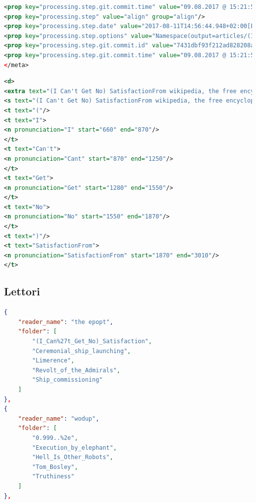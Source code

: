 \documentclass[12pt,a4paper,titlepage]{article}
\begin{document}
\begin{lstlisting}[language=xml,firstnumber=1, caption=Metadati delle annotazioni delle parole in un audio, label=metadati_annotazioni,captionpos=b, basicstyle=\tiny]
<prop key="processing.step.git.commit.time" value="09.08.2017 @ 15:21:55 CEST" group="tokenize"/>
<prop key="processing.step" value="align" group="align"/>
<prop key="processing.step.date" value="2017-08-11T14:56:44.948+02:00[Europe/Berlin]" group="align"/>
<prop key="processing.step.options" value="Namespace(output=articles/(I_Can%27t_Get_No)_Satisfaction/aligned.swc, transcript=articles/(I_Can%27t_Get_No)_Satisfaction/tokenized.swc, g2p=../model_en/model.fst.ser, phone=false, subparser_name=align, dict=../model_en/empty.dic, acoustic_model=../model_en/, audio=articles/(I_Can%27t_Get_No)_Satisfaction/audio.wav)" group="align"/>
<prop key="processing.step.git.commit.id" value="7431dbf93f212ad828208abaf8f518fb8de11ff3" group="align"/>
<prop key="processing.step.git.commit.time" value="09.08.2017 @ 15:21:55 CEST" group="align"/>
</meta>
\end{lstlisting}

\begin{lstlisting}[language=xml,firstnumber=1, caption=Annotazioni delle parole in un audio, label=annotazioni,captionpos=b, basicstyle=\tiny]
<d>
<extra text="(I Can't Get No) SatisfactionFrom wikipedia, the free encyclopedia at e n dot wikipedia dot org.">
<s text="(I Can't Get No) SatisfactionFrom wikipedia, the free encyclopedia at e n dot wikipedia dot org.">
<t text="("/>
<t text="I">
<n pronunciation="I" start="660" end="870"/>
</t>
<t text="Can't">
<n pronunciation="Cant" start="870" end="1250"/>
</t>
<t text="Get">
<n pronunciation="Get" start="1280" end="1550"/>
</t>
<t text="No">
<n pronunciation="No" start="1550" end="1870"/>
</t>
<t text=")"/>
<t text="SatisfactionFrom">
<n pronunciation="SatisfactionFrom" start="1870" end="3010"/>
</t>
\end{lstlisting}

\subsection{Lettori}
\label{subsec:lettori}

\begin{lstlisting}[language=json,firstnumber=1, caption=Formato JSON dei lettori, label=JSON_lettori,captionpos=b]
{
	"reader_name": "the epopt",
	"folder": [
		"(I_Can%27t_Get_No)_Satisfaction",
		"Ceremonial_ship_launching",
		"Limerence",
		"Revolt_of_the_Admirals",
		"Ship_commissioning"
	]
},
{
	"reader_name": "wodup",
	"folder": [
		"0.999..%2e",
		"Execution_by_elephant",
		"Hell_Is_Other_Robots",
		"Tom_Bosley",
		"Truthiness"
	]
},
\end{lstlisting}
\end{document}
